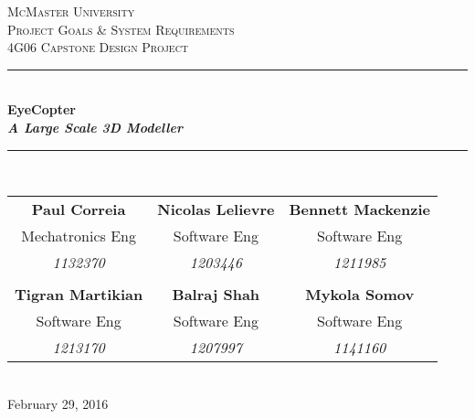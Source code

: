 \documentclass[10pt,letterpaper]{article}
\begin{document}
	
	
	\begin{titlepage}
		\newcommand{\HRule}{\rule{\linewidth}{0.5mm}}
		\center
		
		\textsc{\LARGE McMaster University}\\[1.5cm] %
		\textsc{\Large Project Goals \& System Requirements}\\[0.5cm] %
		\textsc{\large 4G06 Capstone Design Project}\\[0.5cm] %
		
		\HRule \\[0.4cm] 
		{ \huge \bfseries EyeCopter \\[2mm] \textit{A Large Scale 3D Modeller}}\\[0.4cm] %
		\HRule \\[1.5cm]
		
		\begin{tabular}{ccc}
			\bf{Paul Correia}		& \bf{Nicolas Lelievre} 	& \bf{Bennett Mackenzie}		\\
			Mechatronics Eng 		& Software Eng 				& Software Eng 					\\
			\textit{1132370} 		& \textit{1203446}			& \textit{1211985} 				\\ \\
			\bf{Tigran Martikian} 	& \bf{Balraj Shah} 			& \bf{Mykola Somov} 			\\
			Software Eng			& Software Eng				& Software Eng 					\\
			\textit{1213170} 		& \textit{1207997}			& \textit{1141160}
		\end{tabular}\\[4cm]
		
		{\large February 29, 2016}\\[3cm] 
		
		
		\vfill %
		
	\end{titlepage}
	
    
\thispagestyle{empty}

\tableofcontents


\newpage


\thispagestyle{empty}
\end{document}
